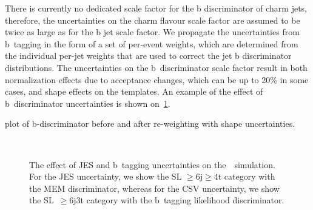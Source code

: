 There is currently no dedicated scale factor for the b discriminator of charm jets, therefore, the uncertainties on the charm flavour scale factor are assumed to be twice as large as for the b jet scale factor. We propagate the uncertainties from b~tagging in the form of a set of per-event weights, which are determined from the individual per-jet weights that are used to correct the jet b discriminator distributions. The uncertainties on the b~discriminator scale factor result in both normalization effects due to acceptance changes, which can be up to 20\% in some cases, and shape effects on the templates. An example of the effect of b~discriminator uncertainties is shown on~\cref{fig:tth_uncertainty_example}. 

\fixme plot of b-discriminator before and after re-weighting with shape uncertainties.

\begin{figure}
\begin{centering}
 \\
\caption[The effect of JES and b~tagging uncertainties on the~\ttHbb~templates.]{The effect of JES and b~tagging uncertainties on the~\ttHbb~simulation. For the JES uncertainty, we show the SL $\geq6$j$\geq4$t category with the MEM discriminator, whereas for the CSV uncertainty, we show the SL~$\geq6$j3t category with the b~tagging likelihood discriminator.}
\label{fig:tth_uncertainty_example}
\end{centering}
\end{figure}

